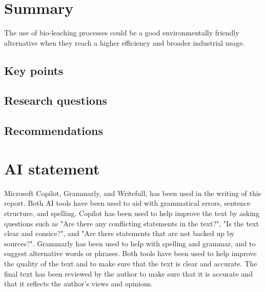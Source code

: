 \section{Summary}

The use of bio-leaching processes could be a good environmentally friendly alternative when they reach a higher efficiency and broader industrial usage.

\subsection{Key points}

\subsection{Research questions}

\subsection{Recommendations}

\section{AI statement}

Microsoft Copilot, Grammarly, and Writefull, has been used in the writing of this report. Both AI tools have been used to aid with grammatical errors, sentence structure, and spelling. Copilot has been used to help improve the text by asking questions such as "Are there any conflicting statements in the text?", "Is the text clear and consice?", and "Are there statements that are not backed up by sources?". Grammarly has been used to help with spelling and grammar, and to suggest alternative words or phrases. Both tools have been used to help improve the quality of the text and to make sure that the text is clear and accurate. The final text has been reviewed by the author to make sure that it is accurate and that it reflects the author's views and opinions.

